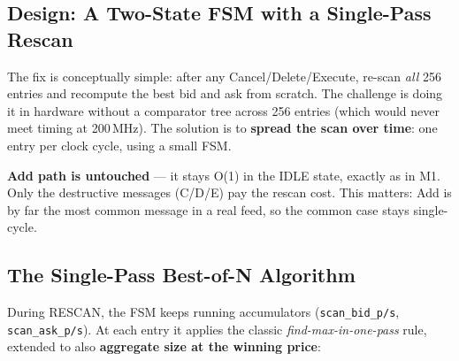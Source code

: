 \documentclass[11pt,a4paper]{article}
\begin{document}
\subsection{Design: A Two-State FSM with a Single-Pass Rescan}

The fix is conceptually simple: after any Cancel/Delete/Execute, re-scan
\emph{all} 256 entries and recompute the best bid and ask from scratch. The
challenge is doing it in hardware without a comparator tree across 256 entries
(which would never meet timing at 200\,MHz). The solution is to \textbf{spread
the scan over time}: one entry per clock cycle, using a small FSM.

\begin{center}
\end{center}

\noindent\textbf{Add path is untouched} --- it stays O(1) in the IDLE state,
exactly as in M1. Only the destructive messages (C/D/E) pay the rescan cost.
This matters: Add is by far the most common message in a real feed, so the
common case stays single-cycle.

\subsection{The Single-Pass Best-of-N Algorithm}

During RESCAN, the FSM keeps running accumulators (\texttt{scan\_bid\_p/s},
\texttt{scan\_ask\_p/s}). At each entry it applies the classic
\emph{find-max-in-one-pass} rule, extended to also \textbf{aggregate size at the
winning price}:
\end{document}
